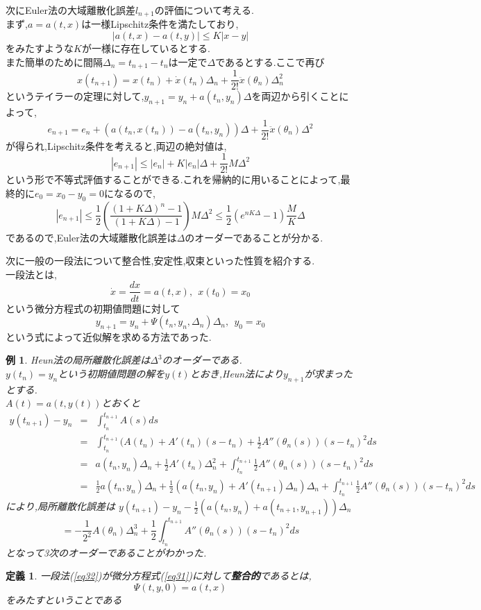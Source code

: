 \documentclass[a4paper]{jreport}
\numberwithin{equation}{section}
\newtheorem{Def}     [Thm]{定義}
\newtheorem{Ex}      [Thm]{例}
\renewenvironment{leftbar}{%
  \def\FrameCommand{\vrule width 1pt \hspace{10pt}}%
  \MakeFramed {\advance\hsize-\width \FrameRestore}}%
 {\endMakeFramed}
\def\defb{\begin{leftbar}\begin{Def}}
\def\defx{\end{Def}\end{leftbar}}
\def\ex{\begin{Ex}}
\def\exx{\end{Ex}}
\def\eq{\begin{equation}}
\def\eqx{\end{equation}}
\def\eqa{\begin{eqnarray}}
\def\eqax{\end{eqnarray}}
\begin{document}
次にEuler法の大域離散化誤差$l_{n+1}$の評価について考える.\\
まず,$a=a(t,x)$は一様Lipschitz条件を満たしており,
\[
|a(t,x) - a(t,y)| \le K |x-y|
\]
をみたすような$K$が一様に存在しているとする.\\
また簡単のために間隔$\Delta_n = t_{n+1} -t_n$は一定で$\Delta$であるとする.ここで再び
\[
x(t_{n+1}) = x(t_n) + \dot{x}(t_n)\Delta_n + \frac{1}{2!} \ddot{x}(\theta_n)\Delta_n^2
\]
というテイラーの定理に対して,$y_{n+1} = y_n + a(t_n,y_n)\Delta $を両辺から引くことによって,
\[
e_{n+1} = e_n + (a(t_n,x(t_n))-a(t_n,y_n))\Delta + \frac{1}{2!} \ddot{x}(\theta_n)\Delta^2
\]
が得られ,Lipschitz条件を考えると,両辺の絶対値は,
\[
|e_{n+1}| \le |e_n| + K|e_n|\Delta + \frac{1}{2!} M\Delta^2
\]
という形で不等式評価することができる.これを帰納的に用いることによって,最終的に$e_0 = x_0 - y_0 = 0$になるので,
\[
|e_{n+1}| \le \frac{1}{2} \left( \frac{(1+K\Delta)^n -1 }{(1+K\Delta)-1} \right)M\Delta^2 \le
\frac{1}{2} (e^{nK\Delta} -1) \frac{M}{K}\Delta
\]
であるので,Euler法の大域離散化誤差は$\Delta$のオーダーであることが分かる.\par
次に一般の一段法について整合性,安定性,収束といった性質を紹介する.\\
一段法とは,
\eq
\label{eq31}
\dot{x} = \frac{dx}{dt} = a(t,x), \  \  x(t_0) = x_0
\eqx
という微分方程式の初期値問題に対して
\eq
\label{eq32}
y_{n+1} = y_n + \Psi(t_n,y_n,\Delta_n) \Delta_n,\  \  y_0 = x_0
\eqx
という式によって近似解を求める方法であった.\\
\ex
Heun法の局所離散化誤差は$\Delta^3$のオーダーである.\\
$y(t_n) = y_n$という初期値問題の解を$y(t)$とおき,Heun法により$y_{n+1}$が求まったとする.\\
$A(t) =a(t,y(t))$とおくと
\eqa
y(t_{n+1}) - y_n &=& \int_{t_n}^{t_{n+1}} A(s)ds\\
&=& \int_{t_n}^{t_{n+1}} (A(t_n)+A'(t_n)(s-t_n)+\frac{1}{2} A''(\theta_n(s))(s-t_n)^2ds\\
&=& a(t_n,y_n)\Delta_n + \frac{1}{2} A'(t_n) \Delta^2_n +  \int_{t_n}^{t_{n+1}}  \frac{1}{2} A''(\theta_n(s))(s-t_n)^2ds\\
&=& \frac{1}{2} a(t_n,y_n)\Delta_n + \frac{1}{2} (a(t_n,y_n)+A'(t_{n+1})\Delta_n)\Delta_n +  \int_{t_n}^{t_{n+1}}  \frac{1}{2} A''(\theta_n(s))(s-t_n)^2ds
\eqax
により,局所離散化誤差は
$y(t_{n+1}) - y_n - \frac{1}{2} (a(t_n,y_n)+a(t_{n+1},y_{n+1}))\Delta_n $
\[
= -\frac{1}{2^2} A(\theta_n)\Delta^3_n + \frac{1}{2} \int_{t_n}^{t_{n+1}}  A''(\theta_n(s))(s-t_n)^2ds
\]
となって3次のオーダーであることがわかった.
\exx
\defb
一段法(\ref{eq32})が微分方程式(\ref{eq31})に対して{\bf 整合的}であるとは,\\
\[
\Psi(t,y,0)  = a(t,x)
\]
をみたすということである
\defx
\end{document}
